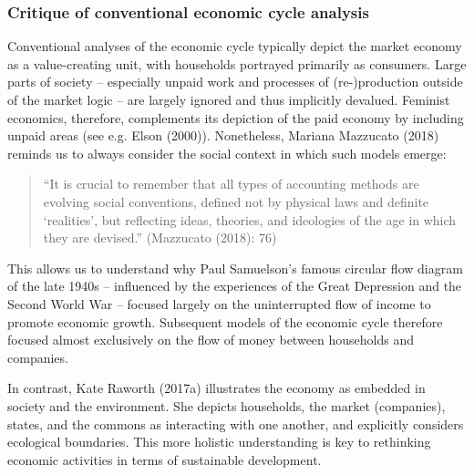 \documentclass[
  a4paper,
  openany]{book}
\begin{document}
\subsubsection{Critique of conventional economic cycle
analysis}\label{critique-of-conventional-economic-cycle-analysis}

Conventional analyses of the economic cycle typically depict the market
economy as a value-creating unit, with households portrayed primarily as
consumers. Large parts of society -- especially unpaid work and
processes of (re-)production outside of the market logic -- are largely
ignored and thus implicitly devalued. Feminist economics, therefore,
complements its depiction of the paid economy by including unpaid areas
(see e.g. Elson (2000)). Nonetheless, Mariana Mazzucato (2018) reminds
us to always consider the social context in which such models emerge:

\begin{quote}
``It is crucial to remember that all types of accounting methods are
evolving social conventions, defined not by physical laws and definite
`realities', but reflecting ideas, theories, and ideologies of the age
in which they are devised.'' (Mazzucato (2018): 76)
\end{quote}

This allows us to understand why Paul Samuelson's famous circular flow
diagram of the late 1940s -- influenced by the experiences of the Great
Depression and the Second World War -- focused largely on the
uninterrupted flow of income to promote economic growth. Subsequent
models of the economic cycle therefore focused almost exclusively on the
flow of money between households and companies.

In contrast, Kate Raworth (2017a) illustrates the economy as embedded in
society and the environment. She depicts households, the market
(companies), states, and the commons as interacting with one another,
and explicitly considers ecological boundaries. This more holistic
understanding is key to rethinking economic activities in terms of
sustainable development.
\end{document}
